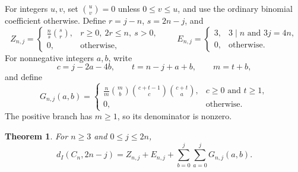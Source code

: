 \documentclass[11pt]{article}
\newtheorem{theorem}{Theorem}
\newcommand{\di}{d_I}
\begin{document}
For integers $u,v$, set $\binom uv=0$ unless $0\leq v\leq u$, and use the
ordinary binomial coefficient otherwise. Define $r=j-n$, $s=2n-j$, and
\[
 Z_{n,j}=\begin{cases}\displaystyle\frac ns\binom sr,
 &r\geq0,\ 2r\leq n,\ s>0,\\0,&\text{otherwise},\end{cases}
 \qquad
 E_{n,j}=\begin{cases}3,&3\mid n\text{ and }3j=4n,\\0,&\text{otherwise}.
 \end{cases}
\]
For nonnegative integers $a,b$, write
\[
 c=j-2a-4b,\qquad t=n-j+a+b,\qquad m=t+b,
\]
and define
\begin{equation}\label{eq:term}
 G_{n,j}(a,b)=
 \begin{cases}
 \displaystyle\frac nm\binom mb\binom{c+t-1}{c}\binom{c+t}{a},
 &c\geq0\text{ and }t\geq1,\\[3pt]
 0,&\text{otherwise}.
 \end{cases}
\end{equation}
The positive branch has $m\geq1$, so its denominator is nonzero.

\begin{theorem}\label{thm:main}
For $n\geq3$ and $0\leq j\leq2n$,
\begin{equation}\label{eq:main}
 \di(C_n,2n-j)=Z_{n,j}+E_{n,j}
       +\sum_{b=0}^{j}\sum_{a=0}^{j}G_{n,j}(a,b).
\end{equation}
\end{theorem}
\end{document}

